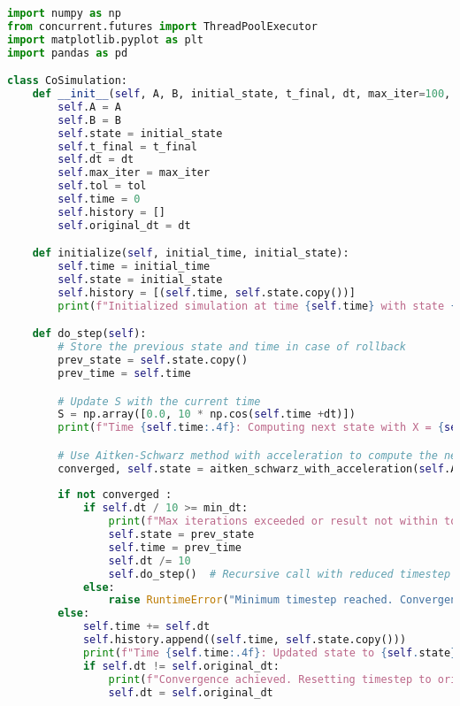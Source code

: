 \newpage
\begin{lstlisting}[style=vscode, language=python, label={tab:A7},caption={méta-modèle d'une plateforme de co-simulation}]
import numpy as np
from concurrent.futures import ThreadPoolExecutor
import matplotlib.pyplot as plt
import pandas as pd

class CoSimulation:
    def __init__(self, A, B, initial_state, t_final, dt, max_iter=100, tol=0.000001):
        self.A = A
        self.B = B
        self.state = initial_state
        self.t_final = t_final
        self.dt = dt
        self.max_iter = max_iter
        self.tol = tol
        self.time = 0
        self.history = []
        self.original_dt = dt

    def initialize(self, initial_time, initial_state):
        self.time = initial_time
        self.state = initial_state
        self.history = [(self.time, self.state.copy())]
        print(f"Initialized simulation at time {self.time} with state {self.state}")

    def do_step(self):
        # Store the previous state and time in case of rollback
        prev_state = self.state.copy()
        prev_time = self.time

        # Update S with the current time
        S = np.array([0.0, 10 * np.cos(self.time +dt)])
        print(f"Time {self.time:.4f}: Computing next state with X = {self.state}")

        # Use Aitken-Schwarz method with acceleration to compute the next state
        converged, self.state = aitken_schwarz_with_acceleration(self.A, self.B, S, self.state, self.max_iter, self.tol)
        
        if not converged :
            if self.dt / 10 >= min_dt:
                print(f"Max iterations exceeded or result not within tolerance. Rolling back and reducing timestep from {self.dt} to {self.dt / 10}.")
                self.state = prev_state
                self.time = prev_time
                self.dt /= 10
                self.do_step()  # Recursive call with reduced timestep
            else:
                raise RuntimeError("Minimum timestep reached. Convergence not achieved.")
        else:
            self.time += self.dt
            self.history.append((self.time, self.state.copy()))
            print(f"Time {self.time:.4f}: Updated state to {self.state}")
            if self.dt != self.original_dt:
                print(f"Convergence achieved. Resetting timestep to original value {self.original_dt}.")
                self.dt = self.original_dt


\end{lstlisting}
